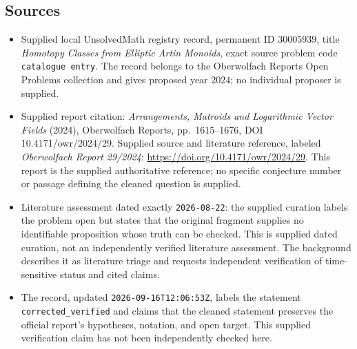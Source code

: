 \documentclass[11pt]{article}
\begin{document}
\subsection{Sources}
\begin{itemize}
\item Supplied local UnsolvedMath registry record, permanent ID $30005939$, title \emph{Homotopy Classes from Elliptic Artin Monoids}, exact source problem code \texttt{catalogue entry}. The record belongs to the Oberwolfach Reports Open Problems collection and gives proposed year $2024$; no individual proposer is supplied.
\item Supplied report citation: \emph{Arrangements, Matroids and Logarithmic Vector Fields} (2024), Oberwolfach Reports, pp.~1615--1676, DOI 10.4171/owr/2024/29. Supplied source and literature reference, labeled \emph{Oberwolfach Report 29/2024}: \url{https://doi.org/10.4171/owr/2024/29}. This report is the supplied authoritative reference; no specific conjecture number or passage defining the cleaned question is supplied.
\item Literature assessment dated exactly \texttt{2026-08-22}: the supplied curation labels the problem open but states that the original fragment supplies no identifiable proposition whose truth can be checked. This is supplied dated curation, not an independently verified literature assessment. The background describes it as literature triage and requests independent verification of time-sensitive status and cited claims.
\item The record, updated \texttt{2026-09-16T12:06:53Z}, labels the statement \texttt{corrected\_verified} and claims that the cleaned statement preserves the official report's hypotheses, notation, and open target. This supplied verification claim has not been independently checked here.
\end{itemize}
\end{document}
